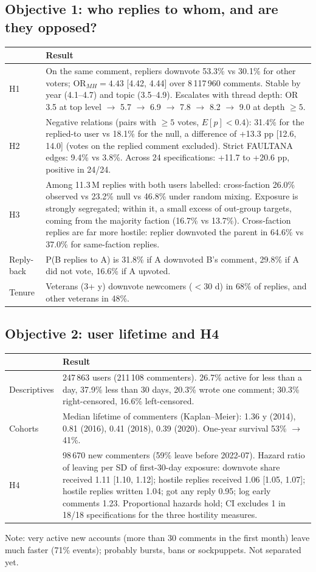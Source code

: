 \documentclass[11pt,a4paper]{article}
\begin{document}
\subsection{Objective 1: who replies to whom, and are they opposed?}
\begin{tabularx}{\textwidth}{@{}l Y@{}}
\toprule
 & Result \\
\midrule
H1 & On the same comment, repliers downvote 53.3\% vs 30.1\% for other voters; $\mathrm{OR}_{MH}=4.43$ [4.42, 4.44] over 8\,117\,960 comments. Stable by year (4.1--4.7) and topic (3.5--4.9). Escalates with thread depth: OR 3.5 at top level $\to$ 5.7 $\to$ 6.9 $\to$ 7.8 $\to$ 8.2 $\to$ 9.0 at depth $\ge5$. \\
H2 & Negative relations (pairs with $\ge5$ votes, $E[p]<0.4$): 31.4\% for the replied-to user vs 18.1\% for the null, a difference of +13.3 pp [12.6, 14.0] (votes on the replied comment excluded). Strict FAULTANA edges: 9.4\% vs 3.8\%. Across 24 specifications: +11.7 to +20.6 pp, positive in 24/24. \\
H3 & Among 11.3\,M replies with both users labelled: cross-faction 26.0\% observed vs 23.2\% null vs 46.8\% under random mixing. Exposure is strongly segregated; within it, a small excess of out-group targets, coming from the majority faction (16.7\% vs 13.7\%). Cross-faction replies are far more hostile: replier downvoted the parent in 64.6\% vs 37.0\% for same-faction replies. \\
Reply-back & P(B replies to A) is 31.8\% if A downvoted B's comment, 29.8\% if A did not vote, 16.6\% if A upvoted. \\
Tenure & Veterans (3+ y) downvote newcomers ($<30$ d) in 68\% of replies, and other veterans in 48\%. \\
\bottomrule
\end{tabularx}

\subsection{Objective 2: user lifetime and H4}
\begin{tabularx}{\textwidth}{@{}l Y@{}}
\toprule
 & Result \\
\midrule
Descriptives & 247\,863 users (211\,108 commenters). 26.7\% active for less than a day, 37.9\% less than 30 days, 20.3\% wrote one comment; 30.3\% right-censored, 16.6\% left-censored. \\
Cohorts & Median lifetime of commenters (Kaplan--Meier): 1.36 y (2014), 0.81 (2016), 0.41 (2018), 0.39 (2020). One-year survival 53\% $\to$ 41\%. \\
H4 & 98\,670 new commenters (59\% leave before 2022-07). Hazard ratio of leaving per SD of first-30-day exposure: downvote share received 1.11 [1.10, 1.12]; hostile replies received 1.06 [1.05, 1.07]; hostile replies written 1.04; got any reply 0.95; log early comments 1.23. Proportional hazards hold; CI excludes 1 in 18/18 specifications for the three hostility measures. \\
\bottomrule
\end{tabularx}
Note: very active new accounts (more than 30 comments in the first month) leave much faster (71\% events); probably bursts, bans or sockpuppets. Not separated yet.
\end{document}
